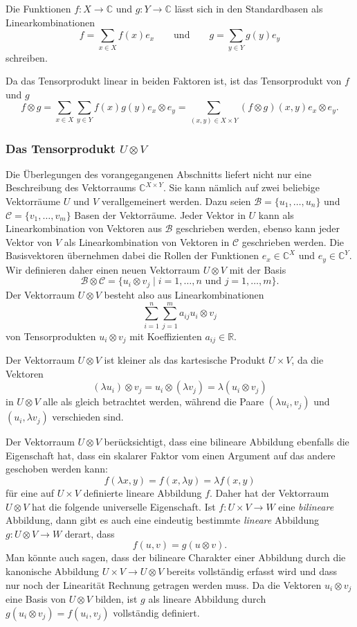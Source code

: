 Die Funktionen $f\colon X\to \mathbb{C}$ und $g\colon Y\to\mathbb{C}$
lässt sich in den Standardbasen als Linearkombinationen
\[
f = \sum_{x\in X} f(x)e_x
\qquad\text{und}\qquad
g = \sum_{y\in Y} g(y)e_y
\]
schreiben.

Da das Tensorprodukt linear in beiden Faktoren ist, ist das Tensorprodukt
von $f$ und $g$ 
\[
f\otimes g
=
\sum_{x\in X}\sum_{y\in Y}
f(x)g(y) e_x\otimes e_y
=
\sum_{(x,y)\in X\times Y}
(f\otimes g)(x,y) e_x\otimes e_y.
\]

%
%
\subsubsection{Das Tensorprodukt $U\otimes V$}
Die Überlegungen des vorangegangenen Abschnitts liefert nicht nur
eine Beschreibung des Vektorraums $\mathbb{C}^{X\times Y}$.
Sie kann nämlich auf zwei beliebige Vektorräume
$U$ und $V$ verallgemeinert werden.
Dazu seien $\mathcal{B}=\{u_1,\dots,u_n\}$ und $\mathcal{C}=\{v_1,\dots,v_m\}$
Basen der Vektorräume.
Jeder Vektor in $U$ kann als Linearkombination von Vektoren aus
$\mathcal{B}$ geschrieben werden, ebenso kann jeder Vektor von $V$
als Linearkombination von Vektoren in $\mathcal{C}$ geschrieben werden.
Die Basisvektoren übernehmen dabei die Rollen der Funktionen
$e_x\in \mathbb{C}^X$ und $e_y\in\mathbb{C}^Y$.
Wir definieren daher einen neuen Vektorraum $U\otimes V$ mit
der Basis
\[
\mathcal{B}\otimes\mathcal{C}
=
\{
u_i\otimes v_j
\mid
i=1,\dots,n\text{ und }j=1,\dots,m
\}.
\]
Der Vektorraum $U\otimes V$ besteht also aus Linearkombinationen
\[
\sum_{i=1}^n \sum_{j=1}^m
a_{i\!j} u_i\otimes v_j
\]
von Tensorprodukten $u_i\otimes v_j$ mit Koeffizienten
$a_{i\!j}\in \mathbb{R}$.

Der Vektorraum $U\otimes V$ ist kleiner als das kartesische Produkt
$U\times V$, da die Vektoren
\[
(\lambda u_i)\otimes v_j
=
u_i\otimes (\lambda v_j)
=
\lambda (u_i\otimes v_j)
\]
in $U\otimes V$ alle als gleich betrachtet werden, während die
Paare $(\lambda u_i,v_j)$ und $(u_i,\lambda v_j)$ verschieden sind.

Der Vektorraum $U\otimes V$ berücksichtigt, dass eine bilineare Abbildung
ebenfalls die Eigenschaft hat, dass ein skalarer Faktor vom einen
Argument auf das andere geschoben werden kann:
\[
f(\lambda x,y) = f(x,\lambda y) = \lambda f(x,y)
\]
für eine auf $U\times V$ definierte lineare Abbildung $f$.
Daher hat der Vektorraum $U\otimes V$ hat die folgende universelle
Eigenschaft.
Ist $f\colon U\times V\to W$ eine {\em bilineare} Abbildung, dann
gibt es auch eine eindeutig bestimmte {\em lineare} Abbildung
$g\colon U\otimes V\to W$ derart, dass
\begin{equation}
f(u,v)
=
g(u\otimes v).
\label{buch:diskret:tensor:eqn:nurlinear}
\end{equation}
Man könnte auch sagen, dass der bilineare Charakter einer Abbildung
durch die kanonische Abbildung $U\times V\to U\otimes V$ bereits
vollständig erfasst wird und dass nur noch der Linearität Rechnung
getragen werden muss.
Da die Vektoren $u_i\otimes v_j$ eine Basis von $U\otimes V$ bilden,
ist $g$ als lineare Abbildung durch $g(u_i\otimes v_j) = f(u_i,v_j)$
vollständig definiert.

